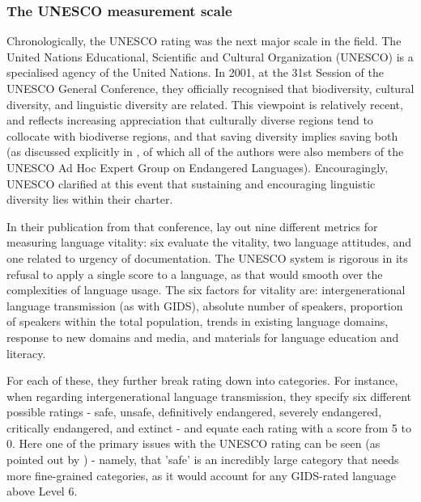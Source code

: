 \subsubsection{The UNESCO measurement scale}
\label{subsec:unesco}

Chronologically, the UNESCO rating was the next major scale in the field. The United Nations Educational, Scientific and Cultural Organization (UNESCO) is a specialised agency of the United Nations. In 2001, at the 31st Session of the UNESCO General Conference, they officially recognised that biodiversity, cultural diversity, and linguistic diversity are related. This viewpoint is relatively recent, and reflects increasing appreciation that culturally diverse regions tend to collocate with biodiverse regions, and that saving diversity implies saving both \citep{nettle2000vanishing, maffi2001biocultural, anderson2006language, krauss2007keynote, gorenflo2012co} (as discussed explicitly in \citet{maffi2001}, of which all of the authors were also members of the UNESCO Ad Hoc Expert Group on Endangered Languages). Encouragingly, UNESCO clarified at this event that sustaining and encouraging linguistic diversity lies within their charter.

In their publication from that conference, \citet{brenzinger2003language} lay out nine different metrics for measuring language vitality: six evaluate the vitality, two language attitudes, and one related to urgency of documentation. The UNESCO system is rigorous in its refusal to apply a single score to a language, as that would smooth over the complexities of language usage. The six factors for vitality are: intergenerational language transmission (as with GIDS), absolute number of speakers, proportion of speakers within the total population, trends in existing language domains, response to new domains and media, and materials for language education and literacy.

For each of these, they further break rating down into categories. For instance, when regarding intergenerational language transmission, they specify six different possible ratings - safe, unsafe, definitively endangered, severely endangered, critically endangered, and extinct - and equate each rating with a score from 5 to 0. Here one of the primary issues with the UNESCO rating can be seen  (as pointed out by \citet{lewis2010assessing}) - namely, that 'safe' is an incredibly large category that needs more fine-grained categories, as it would account for any GIDS-rated language above Level 6.

